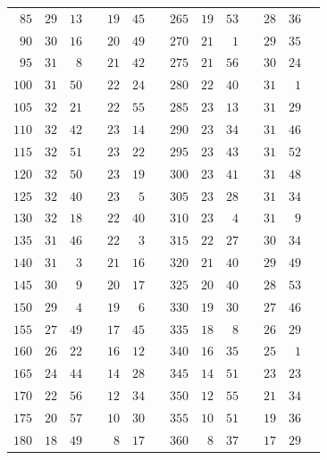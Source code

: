 \begin{center}
\begin{tabular}{r|rrl|rrl||r|rrl|rrl}
$85$&$29$&$13$&&$19$&$45$&&$265$&$19$&$53$&&$28$&$36$&\\
$90$&$30$&$16$&&$20$&$49$&&$270$&$21$&$1$&&$29$&$35$&\\[3pt]
$95$&$31$&$8$&&$21$&$42$&&$275$&$21$&$56$&&$30$&$24$&\\
$100$&$31$&$50$&&$22$&$24$&&$280$&$22$&$40$&&$31$&$1$&\\
$105$&$32$&$21$&&$22$&$55$&&$285$&$23$&$13$&&$31$&$29$&\\
$110$&$32$&$42$&&$23$&$14$&&$290$&$23$&$34$&&$31$&$46$&\\
$115$&$32$&$51$&&$23$&$22$&&$295$&$23$&$43$&&$31$&$52$&\\
$120$&$32$&$50$&&$23$&$19$&&$300$&$23$&$41$&&$31$&$48$&\\[3pt]
$125$&$32$&$40$&&$23$&$5$&&$305$&$23$&$28$&&$31$&$34$&\\
$130$&$32$&$18$&&$22$&$40$&&$310$&$23$&$4$&&$31$&$9$&\\
$135$&$31$&$46$&&$22$&$3$&&$315$&$22$&$27$&&$30$&$34$&\\
$140$&$31$&$3$&&$21$&$16$&&$320$&$21$&$40$&&$29$&$49$&\\
$145$&$30$&$9$&&$20$&$17$&&$325$&$20$&$40$&&$28$&$53$&\\
$150$&$29$&$4$&&$19$&$6$&&$330$&$19$&$30$&&$27$&$46$&\\[3pt]
$155$&$27$&$49$&&$17$&$45$&&$335$&$18$&$8$&&$26$&$29$&\\
$160$&$26$&$22$&&$16$&$12$&&$340$&$16$&$35$&&$25$&$1$&\\
$165$&$24$&$44$&&$14$&$28$&&$345$&$14$&$51$&&$23$&$23$&\\
$170$&$22$&$56$&&$12$&$34$&&$350$&$12$&$55$&&$21$&$34$&\\
$175$&$20$&$57$&&$10$&$30$&&$355$&$10$&$51$&&$19$&$36$&\\
$180$&$18$&$49$&&$8$&$17$&&$360$&$8$&$37$&&$17$&$29$&\\
\end{tabular}
\endgroup
\end{center}
